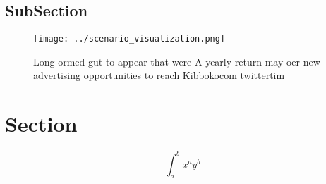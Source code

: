 \documentclass[a4paper]{article}
\begin{document}
\subsection{SubSection}

\begin{figure}
\centering
\texttt{[image: ../scenario\_visualization.png]}
\caption{Long ormed gut to appear that were A yearly return may oer new advertising opportunities to reach Kibbokocom twittertim
}
\end{figure}
 
\section{Section}

\[ \int_{a}^{b}{x^{a}y^{b}} \]
\end{document}
